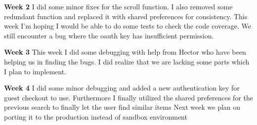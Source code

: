 \documentclass[journal,compsoc, 10pt, draftclsnofoot, onecolumn]{IEEEtran}
\begin{document}
\textbf{Week 2}\newline
I did some minor fixes for the scroll function. I also removed some redundant function and
replaced it with shared preferences for consistency. This week I'm hoping I would be able to do 
some tests to check the code coverage. We still encounter a bug where the oauth key has
insufficient permission. \newline

\textbf{Week 3}\newline
This week I did some debugging with help from Hector who have been helping us in finding the
bugs. I did realize that we are lacking some parts which I plan to implement.\newline

\textbf{Week 4}\newline
I did some minor debugging and added a new authentication key for guest checkout to use.
Furthermore I finally utilized the shared preferences for the previous search to finally let
the user find similar items Next week we plan on porting it to the production instead of
sandbox environment \newline
\end{document}
